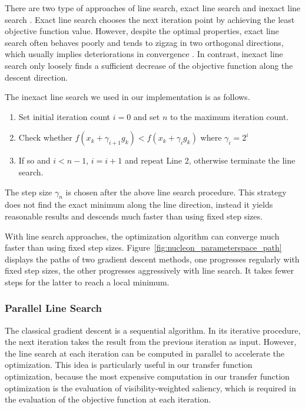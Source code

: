 There are two type of approaches of line search, exact line search and inexact line search \cite{vrahatis_class_2000}.
Exact line search chooses the next iteration point by achieving the least objective function value. However, despite the optimal properties, exact line search often behaves poorly and tends to zigzag in two orthogonal directions, which usually implies deteriorations in convergence \cite{zhou_gradient_2006}.
In contrast, inexact line search only loosely finds a sufficient decrease of the objective function along the descent direction.

The inexact line search we used in our implementation is as follows.

\begin{enumerate}
	\item Set initial iteration count $ i=0 $ and set $ n $ to the maximum iteration count.
	\item Check whether $ f(x_{k}+\gamma_{i+1} g_{k}) < f(x_{k}+\gamma_{i} g_{k}) $ where $ \gamma_{i}=2^{i} $
	\item If so and $ i<n-1 $, $ i=i+1 $ and repeat Line 2, otherwise terminate the line search.
\end{enumerate}

The step size $ \gamma_{n} $ is chosen after the above line search procedure.
This strategy does not find the exact minimum along the line direction, instead it yields reasonable results and descends much faster than using fixed step sizes.

With line search approaches, the optimization algorithm can converge much faster than using fixed step sizes. Figure~\ref{fig:nucleon_parameterspace_path} displays the paths of two gradient descent methods, one progresses regularly with fixed step sizes, the other progresses aggressively with line search. It takes fewer steps for the latter to reach a local minimum.

\subsubsection{Parallel Line Search}
The classical gradient descent is a sequential algorithm. In its iterative procedure, the next iteration takes the result from the previous iteration as input.
However, the line search at each iteration can be computed in parallel to accelerate the optimization. This idea is particularly useful in our transfer function optimization, because the most expensive computation in our transfer function optimization is the evaluation of visibility-weighted saliency, which is required in the evaluation of the objective function at each iteration.

